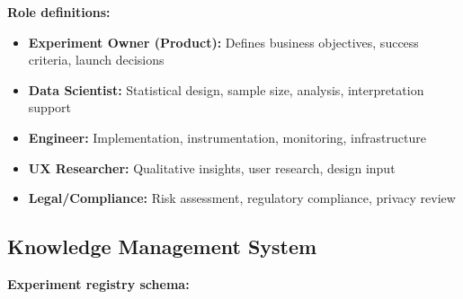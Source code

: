 \textbf{Role definitions:}

\begin{itemize}
    \item \textbf{Experiment Owner (Product):} Defines business objectives, success criteria, launch decisions
    \item \textbf{Data Scientist:} Statistical design, sample size, analysis, interpretation support
    \item \textbf{Engineer:} Implementation, instrumentation, monitoring, infrastructure
    \item \textbf{UX Researcher:} Qualitative insights, user research, design input
    \item \textbf{Legal/Compliance:} Risk assessment, regulatory compliance, privacy review
\end{itemize}

\subsection{Knowledge Management System}

\textbf{Experiment registry schema:}

